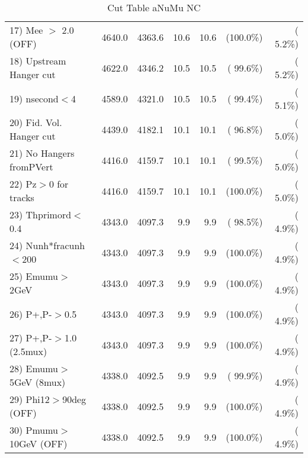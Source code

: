 \begin{table}[h!]
\begin{tabular}{||l||r|r|r|r|r|r||}
 17) Mee $>$ 2.0  (OFF)   &       4640.0 &       4363.6 &         10.6 &         10.6 & (100.0\%) & (  5.2\%) \\
 18) Upstream Hanger cut  &       4622.0 &       4346.2 &         10.5 &         10.5 & ( 99.6\%) & (  5.2\%) \\
 19) nsecond$<$4          &       4589.0 &       4321.0 &         10.5 &         10.5 & ( 99.4\%) & (  5.1\%) \\
 20) Fid. Vol. Hanger cut &       4439.0 &       4182.1 &         10.1 &         10.1 & ( 96.8\%) & (  5.0\%) \\
 21) No Hangers fromPVert &       4416.0 &       4159.7 &         10.1 &         10.1 & ( 99.5\%) & (  5.0\%) \\
 22) Pz$>$0 for tracks    &       4416.0 &       4159.7 &         10.1 &         10.1 & (100.0\%) & (  5.0\%) \\
 23) Thprimord$<$0.4      &       4343.0 &       4097.3 &          9.9 &          9.9 & ( 98.5\%) & (  4.9\%) \\
 24) Nunh*fracunh$<$200   &       4343.0 &       4097.3 &          9.9 &          9.9 & (100.0\%) & (  4.9\%) \\
 25) Emumu$>$2GeV         &       4343.0 &       4097.3 &          9.9 &          9.9 & (100.0\%) & (  4.9\%) \\
 26) P+,P-$>$0.5          &       4343.0 &       4097.3 &          9.9 &          9.9 & (100.0\%) & (  4.9\%) \\
 27) P+,P-$>$1.0 (2.5mux) &       4343.0 &       4097.3 &          9.9 &          9.9 & (100.0\%) & (  4.9\%) \\
 28) Emumu$>$5GeV  (8mux) &       4338.0 &       4092.5 &          9.9 &          9.9 & ( 99.9\%) & (  4.9\%) \\
 29) Phi12$>$90deg  (OFF) &       4338.0 &       4092.5 &          9.9 &          9.9 & (100.0\%) & (  4.9\%) \\
 30) Pmumu$>$10GeV  (OFF) &       4338.0 &       4092.5 &          9.9 &          9.9 & (100.0\%) & (  4.9\%) \\
 \hline
 \hline
 \end{tabular}
 \caption{Cut Table  aNuMu NC }
 \label{tab-cutCohPi-}
 \end{table}
